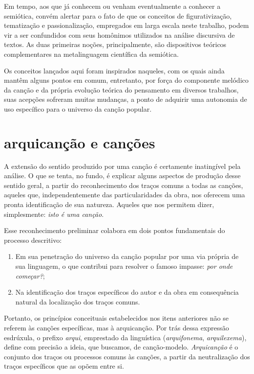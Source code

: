 Em tempo, aos que já conhecem ou venham eventualmente a conhecer a
semiótica, convém alertar para o fato de que os conceitos de
figurativização, tematização e passionalização, empregados em larga
escala neste trabalho, podem vir a ser confundidos com seus homônimos
utilizados na análise discursiva de textos. As duas primeiras noções,
principalmente, são dispositivos teóricos complementares na
metalinguagem científica da semiótica.

Os conceitos lançados aqui foram inspirados naqueles, com os quais ainda
mantêm alguns pontos em comum, entretanto, por força do componente
melódico da canção e da própria evolução teórica do pensamento em
diversos trabalhos, suas acepções sofreram muitas mudanças, a ponto de
adquirir uma autonomia de uso específico para o universo da canção
popular.

\section{arquicanção e canções}

A extensão do sentido produzido por uma canção é certamente inatingível
pela análise. O que se tenta, no fundo, é explicar alguns aspectos de
produção desse sentido geral, a partir do reconhecimento dos traços
comuns a todas as canções, aqueles que, independentemente das
particularidades da obra, nos oferecem uma pronta identificação de sua
natureza. Aqueles que nos permitem dizer, simplesmente: \textit{isto é uma
canção}.

Esse reconhecimento preliminar colabora em dois pontos fundamentais do
processo descritivo:

\begin{enumerate}[label=\scshape\alph*.]
\item Em sua penetração do universo da canção popular por uma via própria
de sua linguagem, o que contribui para resolver o famoso impasse: \textit{por
onde começar?};

\item Na identificação dos traços específicos do autor e da obra em
consequência natural da localização dos traços comuns.
\end{enumerate}

Portanto, os princípios conceituais estabelecidos nos itens anteriores
não se referem às canções específicas, mas à arquicanção. Por trás dessa
expressão esdrúxula, o prefixo \textit{arqui}, emprestado da linguística
(\textit{arquifonema}, \textit{arquilexema}), define com precisão a ideia, que buscamos,
de canção-modelo. \textit{Arquicanção} é o conjunto dos traços ou processos
comuns às canções, a partir da neutralização dos traços específicos que
as opõem entre si.

